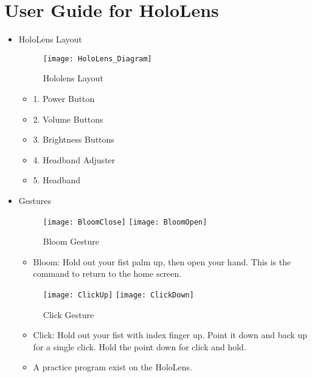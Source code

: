 \section{User Guide for HoloLens}
\begin{itemize}
    \item HoloLens Layout

    \begin{figure}[H]
    \texttt{[image: HoloLens\_Diagram]}
    \centering
    \caption{Hololens Layout}
    \label{fig:HoloLens_Diagram}
    \end{figure}

    \begin{itemize}
        \item 1. Power Button
        \item 2. Volume Buttons
        \item 3. Brightness Buttons
        \item 4. Headband Adjuster
        \item 5. Headband
    \end{itemize}

    \item Gestures

    \begin{figure}[H]
        \centering
        \texttt{[image: BloomClose]}
        \texttt{[image: BloomOpen]}
        \caption{Bloom Gesture}
        \label{fig:BloomGesture}
    \end{figure}

        \begin{itemize}
            \item Bloom: Hold out your fist palm up, then open your hand. This is the command to return to the home screen.
        \end{itemize}

    \begin{figure}[H]
        \centering
        \texttt{[image: ClickUp]}
        \texttt{[image: ClickDown]}
        \caption{Click Gesture}
        \label{fig:ClickGesture}
    \end{figure}

    \begin{itemize}
        \item Click: Hold out your fist with index finger up. Point it down and back up for a single click. Hold the point down for click and hold.
        \item A practice program exist on the HoloLens.
    \end{itemize}


\end{itemize}
